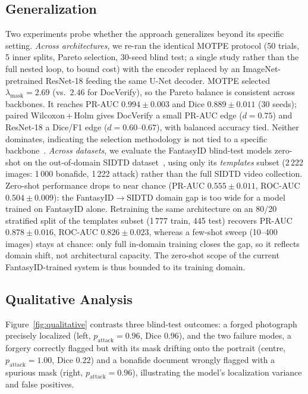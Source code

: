 \documentclass[final,5p,times,twocolumn,number]{elsarticle}
\newcommand{\rev}[1]{#1}
\begin{document}
\subsection{\rev{Generalization}}
\label{subsec:generalization}

\rev{Two experiments probe whether the approach generalizes beyond its specific
setting. \emph{Across architectures}, we re-ran the identical MOTPE protocol
(50 trials, 5 inner splits, Pareto selection, 30-seed blind test; a single study
rather than the full nested loop, to bound cost) with the encoder replaced by an
ImageNet-pretrained ResNet-18 feeding the same U-Net decoder. MOTPE selected
$\lambda_{\text{mask}} = 2.69$ (vs.\ $2.46$ for DocVerify), so the Pareto balance
is consistent across backbones. It reaches PR-AUC $0.994 \pm 0.003$ and Dice
$0.889 \pm 0.011$ (30 seeds); paired Wilcoxon\,+\,Holm gives DocVerify a small
PR-AUC edge ($d = 0.75$) and ResNet-18 a Dice/F1 edge ($d = 0.60$--$0.67$), with
balanced accuracy tied. Neither dominates, indicating the selection methodology
is not tied to a specific backbone~\citep{docverify_zenodo}. \emph{Across datasets},
we evaluate the FantasyID blind-test models zero-shot on the out-of-domain SIDTD
dataset~\citep{sidtd2024}, using only its \emph{templates} subset (2\,222 images:
1\,000 bonafide, 1\,222 attack) rather than the full SIDTD video collection.
Zero-shot performance drops to near chance (PR-AUC $0.555 \pm 0.011$, ROC-AUC
$0.504 \pm 0.009$): the FantasyID$\rightarrow$SIDTD domain gap is too wide for a
model trained on FantasyID alone. Retraining the same architecture on an 80/20
stratified split of the templates subset (1\,777 train, 445 test) recovers PR-AUC
$0.878 \pm 0.016$, ROC-AUC $0.826 \pm 0.023$, whereas a few-shot sweep
(10--400 images) stays at chance: only full in-domain training closes the gap, so
it reflects domain shift, not architectural capacity. The zero-shot scope of the
current FantasyID-trained system is thus bounded to its training domain.}

\subsection{Qualitative Analysis}
\label{subsec:qualitative}

\rev{Figure~\ref{fig:qualitative} contrasts three blind-test outcomes: a forged
photograph precisely localized (left, $p_{\text{attack}}=0.96$, Dice $0.96$), and
the two failure modes, a forgery correctly flagged but with its mask drifting onto
the portrait (centre, $p_{\text{attack}}=1.00$, Dice $0.22$) and a bonafide
document wrongly flagged with a spurious mask (right, $p_{\text{attack}}=0.96$),
illustrating the model's localization variance and false positives.}
\end{document}
